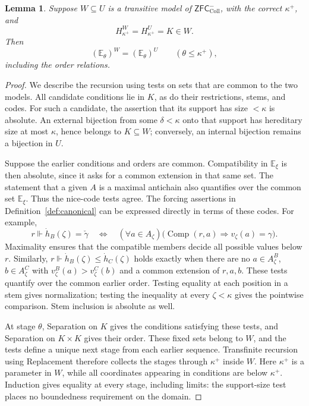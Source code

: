 \documentclass[10pt,a4paper]{amsart}
\newtheorem{lemma}[theorem]{Lemma}
\theoremstyle{definition}
\theoremstyle{remark}
\newcommand{\EE}{\mathbb E}
\newcommand{\ZFCc}{\mathsf{ZFC}^{-}_{\mathrm{Coll}}}
\DeclareMathOperator{\Comp}{Comp}
\begin{document}
\begin{lemma}
\label{lem:canonical-absolute}
Suppose \(W\subseteq U\) is a transitive model of
\(\ZFCc\), with the correct \(\kappa^+\), and
\[
 H_{\kappa^+}^W=H_{\kappa^+}^U=K\in W.
\]
Then
\[
 (\EE_\theta)^W=(\EE_\theta)^U
                 \qquad(\theta\leq\kappa^+),
\]
including the order relations.
\end{lemma}
\begin{proof}
We describe the recursion using tests on sets that are
common to the two models. All candidate conditions lie
in \(K\), as do their restrictions, stems, and codes.
For such a candidate, the assertion that its support has
size \(<\kappa\) is absolute. An external bijection
from some \(\delta<\kappa\) onto that support has
hereditary size at most \(\kappa\), hence belongs to
\(K\subseteq W\); conversely, an internal bijection
remains a bijection in \(U\).

Suppose the earlier conditions and orders are common.
Compatibility in \(\EE_\xi\) is then absolute, since
it asks for a common extension in that same set. The
statement that a given \(A\) is a maximal antichain
also quantifies over the common set \(\EE_\xi\).
Thus the nice-code tests agree. The forcing assertions
in Definition~\ref{def:canonical} can be expressed
directly in terms of these codes. For example,
\[
 r\Vdash\dot h_B(\zeta)=\check\gamma
 \quad\Longleftrightarrow\quad
 (\forall a\in A_\zeta)
   \bigl(\Comp(r,a)\Rightarrow v_\zeta(a)=\gamma\bigr).
\]
Maximality ensures that the compatible members decide
all possible values below \(r\). Similarly,
\(r\Vdash\dot h_B(\zeta)\leq\dot h_C(\zeta)\)
holds exactly when there are no
\(a\in A_\zeta^B\), \(b\in A_\zeta^C\) with
\(v_\zeta^B(a)>v_\zeta^C(b)\) and a common
extension of \(r,a,b\). These tests quantify over
the common earlier order. Testing equality at each
position in a stem gives normalization; testing the
inequality at every \(\zeta<\kappa\) gives the
pointwise comparison. Stem inclusion is absolute as well.

At stage \(\theta\), Separation on \(K\) gives
the conditions satisfying these tests, and Separation
on \(K\times K\) gives their order. These fixed sets
belong to \(W\), and the tests define a unique next stage
from each earlier sequence. Transfinite recursion using
Replacement therefore collects the stages through
\(\kappa^+\) inside \(W\). Here \(\kappa^+\)
is a parameter in \(W\), while all coordinates
appearing in conditions are below \(\kappa^+\).
Induction gives equality at every stage, including
limits: the support-size test places no boundedness
requirement on the domain.
\end{proof}
\end{document}
